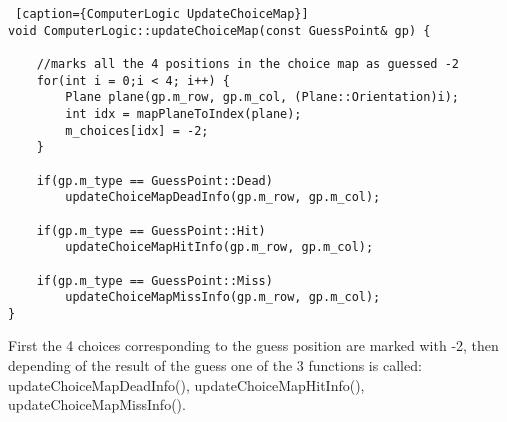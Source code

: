 \begin{lstlisting} [caption={ComputerLogic UpdateChoiceMap}]
void ComputerLogic::updateChoiceMap(const GuessPoint& gp) {

	//marks all the 4 positions in the choice map as guessed -2
	for(int i = 0;i < 4; i++) {
		Plane plane(gp.m_row, gp.m_col, (Plane::Orientation)i);
		int idx = mapPlaneToIndex(plane);
		m_choices[idx] = -2;
	}
	
	if(gp.m_type == GuessPoint::Dead)
		updateChoiceMapDeadInfo(gp.m_row, gp.m_col);
	
	if(gp.m_type == GuessPoint::Hit)
		updateChoiceMapHitInfo(gp.m_row, gp.m_col);
	
	if(gp.m_type == GuessPoint::Miss)
		updateChoiceMapMissInfo(gp.m_row, gp.m_col);
}
\end{lstlisting}

First the 4 choices corresponding to the guess position are marked with -2, then depending of the result of the guess one of the 3 functions is called: updateChoiceMapDeadInfo(), updateChoiceMapHitInfo(), updateChoiceMapMissInfo(). 

